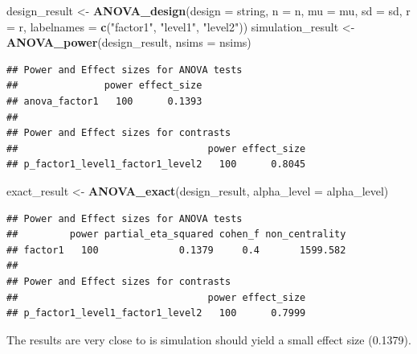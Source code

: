 \documentclass[]{book}
\newenvironment{Shaded}{\begin{snugshade}}{\end{snugshade}}
\newcommand{\DataTypeTok}[1]{\textcolor[rgb]{0.13,0.29,0.53}{#1}}
\newcommand{\KeywordTok}[1]{\textcolor[rgb]{0.13,0.29,0.53}{\textbf{#1}}}
\newcommand{\NormalTok}[1]{#1}
\newcommand{\StringTok}[1]{\textcolor[rgb]{0.31,0.60,0.02}{#1}}
\begin{document}
\begin{Shaded}
\begin{Highlighting}[]
\NormalTok{design_result <-}\StringTok{ }\KeywordTok{ANOVA_design}\NormalTok{(}\DataTypeTok{design =}\NormalTok{ string,}
                   \DataTypeTok{n =}\NormalTok{ n, }
                   \DataTypeTok{mu =}\NormalTok{ mu, }
                   \DataTypeTok{sd =}\NormalTok{ sd, }
                   \DataTypeTok{r =}\NormalTok{ r, }
                   \DataTypeTok{labelnames =} \KeywordTok{c}\NormalTok{(}\StringTok{"factor1"}\NormalTok{, }\StringTok{"level1"}\NormalTok{, }\StringTok{"level2"}\NormalTok{))}
\NormalTok{simulation_result <-}\StringTok{ }\KeywordTok{ANOVA_power}\NormalTok{(design_result, }\DataTypeTok{nsims =}\NormalTok{ nsims)}
\end{Highlighting}
\end{Shaded}

\begin{verbatim}
## Power and Effect sizes for ANOVA tests
##               power effect_size
## anova_factor1   100      0.1393
## 
## Power and Effect sizes for contrasts
##                                 power effect_size
## p_factor1_level1_factor1_level2   100      0.8045
\end{verbatim}

\begin{Shaded}
\begin{Highlighting}[]
\NormalTok{exact_result <-}\StringTok{ }\KeywordTok{ANOVA_exact}\NormalTok{(design_result, }\DataTypeTok{alpha_level =}\NormalTok{ alpha_level)}
\end{Highlighting}
\end{Shaded}

\begin{verbatim}
## Power and Effect sizes for ANOVA tests
##         power partial_eta_squared cohen_f non_centrality
## factor1   100              0.1379     0.4       1599.582
## 
## Power and Effect sizes for contrasts
##                                 power effect_size
## p_factor1_level1_factor1_level2   100      0.7999
\end{verbatim}

The results are very close to is simulation should yield a small effect size (0.1379).


\end{document}
